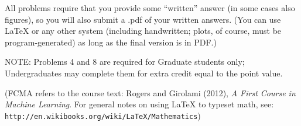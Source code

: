 \documentclass[10pt]{article}
\newcommand{\latex}{\LaTeX\xspace}
\begin{document}
All problems require that you provide some ``written'' answer (in some cases also figures), so you will also submit a .pdf of your written answers.  (You can use \latex or any other system (including handwritten; plots, of course, must be program-generated) as long as the final version is in PDF.)


NOTE: Problems 4 and 8 are required for Graduate students only; Undergraduates may complete them for extra credit equal to the point value.

(FCMA refers to the course text: Rogers and Girolami (2012), {\em A First Course in Machine Learning}.  For general notes on using \latex to typeset math, see: {\tt http://en.wikibooks.org/wiki/LaTeX/Mathematics})
\vspace{.5cm}

\end{document}

